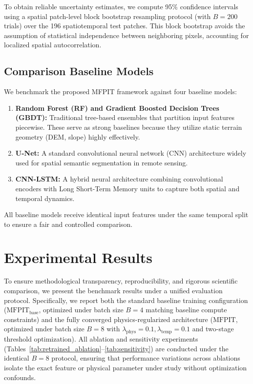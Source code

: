 \documentclass[journal]{IEEEtran}
\begin{document}
To obtain reliable uncertainty estimates, we compute 95\% confidence intervals using a spatial patch-level block bootstrap resampling protocol (with $B=200$ trials) over the 196 spatiotemporal test patches. This block bootstrap avoids the assumption of statistical independence between neighboring pixels, accounting for localized spatial autocorrelation.

\subsection{Comparison Baseline Models}
We benchmark the proposed MFPIT framework against four baseline models:
\begin{enumerate}
    \item \textbf{Random Forest (RF) and Gradient Boosted Decision Trees (GBDT):} Traditional tree-based ensembles that partition input features piecewise. These serve as strong baselines because they utilize static terrain geometry (DEM, slope) highly effectively.
    \item \textbf{U-Net:} A standard convolutional neural network (CNN) architecture widely used for spatial semantic segmentation in remote sensing.
    \item \textbf{CNN-LSTM:} A hybrid neural architecture combining convolutional encoders with Long Short-Term Memory units to capture both spatial and temporal dynamics.
\end{enumerate}
All baseline models receive identical input features under the same temporal split to ensure a fair and controlled comparison.

\section{Experimental Results}
To ensure methodological transparency, reproducibility, and rigorous scientific comparison, we present the benchmark results under a unified evaluation protocol. Specifically, we report both the standard baseline training configuration ($\text{MFPIT}_{\text{base}}$, optimized under batch size $B=4$ matching baseline compute constraints) and the fully converged physics-regularized architecture ($\text{MFPIT}$, optimized under batch size $B=8$ with $\lambda_{\text{phys}} = 0.1, \lambda_{\text{temp}} = 0.1$ and two-stage threshold optimization). All ablation and sensitivity experiments (Tables~\ref{tab:retrained_ablation}--\ref{tab:sensitivity}) are conducted under the identical $B=8$ protocol, ensuring that performance variations across ablations isolate the exact feature or physical parameter under study without optimization confounds.
\end{document}
